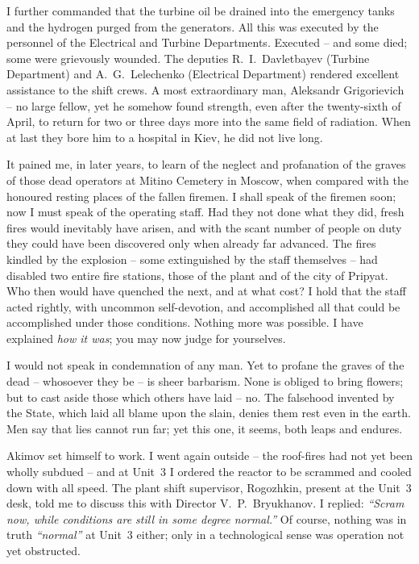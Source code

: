 \documentclass[openright]{bookest}
\begin{document}
I further commanded that the turbine oil be drained into the emergency tanks and the hydrogen purged from the generators. All this was executed by the personnel of the Electrical and Turbine Departments. Executed -- and some died; some were grievously wounded. The deputies R.~I.~Davletbayev (Turbine Department) and A.~G.~Lelechenko (Electrical Department) rendered excellent assistance to the shift crews. A most extraordinary man, Aleksandr Grigorievich -- no large fellow, yet he somehow found strength, even after the twenty-sixth of April, to return for two or three days more into the same field of radiation. When at last they bore him to a hospital in Kiev, he did not live long.

It pained me, in later years, to learn of the neglect and profanation of the graves of those dead operators at Mitino Cemetery in Moscow, when compared with the honoured resting places of the fallen firemen. I shall speak of the firemen soon; now I must speak of the operating staff. Had they not done what they did, fresh fires would inevitably have arisen, and with the scant number of people on duty they could have been discovered only when already far advanced. The fires kindled by the explosion -- some extinguished by the staff themselves -- had disabled two entire fire stations, those of the plant and of the city of Pripyat. Who then would have quenched the next, and at what cost? I hold that the staff acted rightly, with uncommon self-devotion, and accomplished all that could be accomplished under those conditions. Nothing more was possible. I have explained \textit{how it was}; you may now judge for yourselves.

I would not speak in condemnation of any man. Yet to profane the graves of the dead -- whosoever they be -- is sheer barbarism. None is obliged to bring flowers; but to cast aside those which others have laid -- no. The falsehood invented by the State, which laid all blame upon the slain, denies them rest even in the earth. Men say that lies cannot run far; yet this one, it seems, both leaps and endures.

Akimov set himself to work. I went again outside -- the roof-fires had not yet been wholly subdued -- and at Unit~3 I ordered the reactor to be scrammed and cooled down with all speed. The plant shift supervisor, Rogozhkin, present at the Unit~3 desk, told me to discuss this with Director V.~P.~Bryukhanov. I replied: \textit{``Scram now, while conditions are still in some degree normal.''} Of course, nothing was in truth \textit{``normal''} at Unit~3 either; only in a technological sense was operation not yet obstructed.
\end{document}
